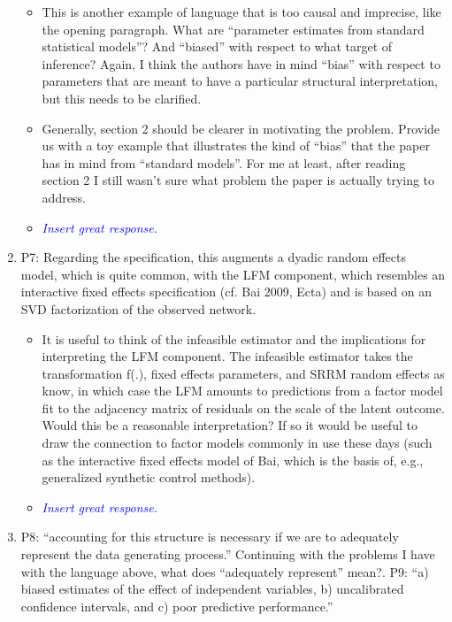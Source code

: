 \begin{enumerate}
	\begin{itemize}
		\item This is another example of language that is too causal and imprecise, like the opening paragraph. What are “parameter estimates from standard statistical models”?  And “biased” with respect to what target of inference? Again, I think the authors have in mind “bias” with respect to parameters that are meant to have a particular structural interpretation, but this needs to be clarified.
		\item Generally, section 2 should be clearer in motivating the problem.  Provide us with a toy example that illustrates the kind of “bias” that the paper has in mind from “standard models”.  For me at least, after reading section 2 I still wasn’t sure what problem the paper is actually trying to address.
	\end{itemize}
	\begin{itemize}
		\item \textcolor{blue}{ \emph{
		Insert great response.
		}}
	\end{itemize}
	\item P7: Regarding the specification, this augments a dyadic random effects model, which is quite common, with  the LFM component, which resembles an interactive fixed effects specification (cf. Bai 2009, Ecta) and is based on an SVD factorization of the observed network.
	\begin{itemize}
		\item It is useful to think of the infeasible estimator and the implications for interpreting the LFM component.  The infeasible estimator takes the transformation f(.), fixed effects parameters, and SRRM random effects as know, in which case the LFM amounts to predictions from a factor model fit to the adjacency matrix of residuals on the scale of the latent outcome.  Would this be a reasonable interpretation? If so it would be useful to draw the connection to factor models commonly in use these days (such as the interactive fixed effects model of Bai, which is the basis of, e.g., generalized synthetic control methods).
	\end{itemize}
	\begin{itemize}
		\item \textcolor{blue}{ \emph{
		Insert great response.
		}}
	\end{itemize}
	\item P8: “accounting for this structure is necessary if we are to adequately represent the data generating process.” Continuing with the problems I have with the language above, what does “adequately represent” mean?. P9: “a) biased estimates of the effect of independent variables, b) uncalibrated confidence intervals, and c) poor predictive performance.”

\end{enumerate}
